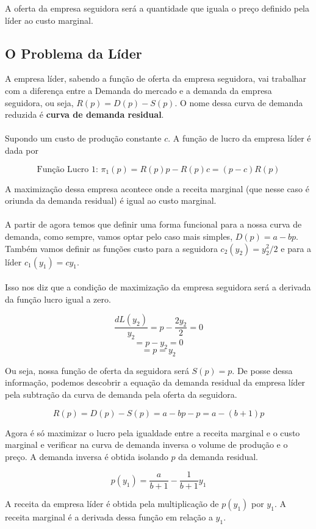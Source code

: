 \documentclass[a4paper,11pt,oneside]{book}
\theoremstyle{definition}
\theoremstyle{break}
\begin{document}
A oferta da empresa seguidora será a quantidade que iguala o preço definido pela líder ao custo marginal.

\subsection{O Problema da Líder}

A empresa líder, sabendo a função de oferta da empresa seguidora, vai trabalhar com a diferença entre a Demanda do mercado e a demanda da empresa seguidora, ou seja, $R(p) = D(p) - S(p)$. O nome dessa curva de demanda reduzida é \textbf{curva de demanda residual}.
\\~\\
Supondo um custo de produção constante $c$. A função de lucro da empresa líder é dada por

$$ \textrm{Função Lucro 1: } \pi_1(p) = R(p)p - R(p)c = (p - c)R(p)  $$

A maximização dessa empresa acontece onde a receita marginal (que nesse caso é oriunda da demanda residual) é igual ao custo marginal. 
\\~\\
A partir de agora temos que definir uma forma funcional para a nossa curva de demanda, como sempre, vamos optar pelo caso mais simples, $D(p) = a - bp$. Também vamos definir as funções custo para a seguidora $c_2(y_2) = y_2^2/2$ e para a líder $c_1(y_1) = cy_1$.
\\~\\
Isso nos diz que a condição de maximização da empresa seguidora será a derivada da função lucro igual a zero.

$$ \frac{d L(y_2)}{y_2} = p - \frac{2y_2}{2} = 0 $$
$$ = p - y_2 = 0 $$
$$ = p = y_2 $$

Ou seja, nossa função de oferta da seguidora será $S(p) = p$. De posse dessa informação, podemos descobrir a equação da demanda residual da empresa líder pela subtração da curva de demanda pela oferta da seguidora.

$$ R(p) = D(p) - S(p) = a - bp - p = a - (b + 1)p $$

Agora é só maximizar o lucro pela igualdade entre a receita marginal e o custo marginal e verificar na curva de demanda inversa o volume de produção e o preço. A demanda inversa é obtida isolando $p$ da demanda residual.

$$ p(y_1) = \frac{a}{b+1}-\frac{1}{b+1}y_1 $$

A receita da empresa líder é obtida pela multiplicação de $p(y_1)$ por $y_1$. A receita marginal é a derivada dessa função em relação a $y_1$.
\end{document}
